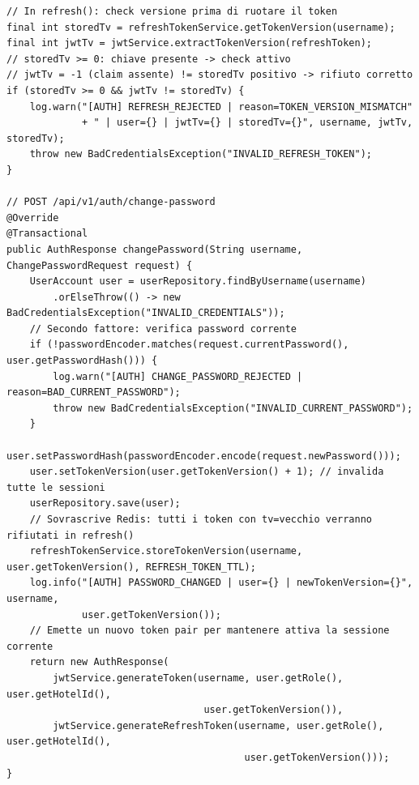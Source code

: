 ﻿\documentclass[a4paper,12pt]{report}
\begin{document}
\begin{securebox}[title={Codice Sicuro --- AuthServiceImpl.java (check tv in refresh + changePassword)}]
\begin{lstlisting}[style=java]
// In refresh(): check versione prima di ruotare il token
final int storedTv = refreshTokenService.getTokenVersion(username);
final int jwtTv = jwtService.extractTokenVersion(refreshToken);
// storedTv >= 0: chiave presente -> check attivo
// jwtTv = -1 (claim assente) != storedTv positivo -> rifiuto corretto
if (storedTv >= 0 && jwtTv != storedTv) {
    log.warn("[AUTH] REFRESH_REJECTED | reason=TOKEN_VERSION_MISMATCH"
             + " | user={} | jwtTv={} | storedTv={}", username, jwtTv, storedTv);
    throw new BadCredentialsException("INVALID_REFRESH_TOKEN");
}

// POST /api/v1/auth/change-password
@Override
@Transactional
public AuthResponse changePassword(String username, ChangePasswordRequest request) {
    UserAccount user = userRepository.findByUsername(username)
        .orElseThrow(() -> new BadCredentialsException("INVALID_CREDENTIALS"));
    // Secondo fattore: verifica password corrente
    if (!passwordEncoder.matches(request.currentPassword(), user.getPasswordHash())) {
        log.warn("[AUTH] CHANGE_PASSWORD_REJECTED | reason=BAD_CURRENT_PASSWORD");
        throw new BadCredentialsException("INVALID_CURRENT_PASSWORD");
    }
    user.setPasswordHash(passwordEncoder.encode(request.newPassword()));
    user.setTokenVersion(user.getTokenVersion() + 1); // invalida tutte le sessioni
    userRepository.save(user);
    // Sovrascrive Redis: tutti i token con tv=vecchio verranno rifiutati in refresh()
    refreshTokenService.storeTokenVersion(username, user.getTokenVersion(), REFRESH_TOKEN_TTL);
    log.info("[AUTH] PASSWORD_CHANGED | user={} | newTokenVersion={}", username,
             user.getTokenVersion());
    // Emette un nuovo token pair per mantenere attiva la sessione corrente
    return new AuthResponse(
        jwtService.generateToken(username, user.getRole(), user.getHotelId(),
                                  user.getTokenVersion()),
        jwtService.generateRefreshToken(username, user.getRole(), user.getHotelId(),
                                         user.getTokenVersion()));
}
\end{lstlisting}
\end{securebox}
\end{document}
